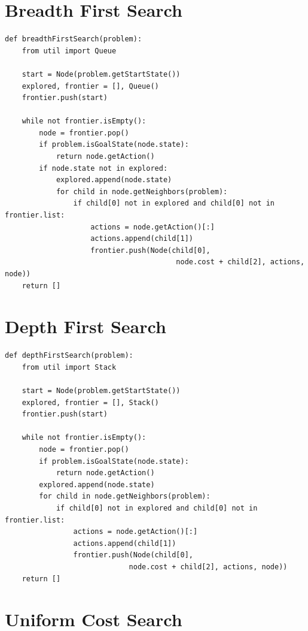 \documentclass[a4paper,12pt]{report}
\begin{document}
\section{Breadth First Search}
\begin{Verbatim}[frame=single]
def breadthFirstSearch(problem):
    from util import Queue

    start = Node(problem.getStartState())
    explored, frontier = [], Queue()
    frontier.push(start)

    while not frontier.isEmpty():
        node = frontier.pop()
        if problem.isGoalState(node.state):
            return node.getAction()
        if node.state not in explored:
            explored.append(node.state)
            for child in node.getNeighbors(problem):
                if child[0] not in explored and child[0] not in frontier.list:
                    actions = node.getAction()[:]
                    actions.append(child[1])
                    frontier.push(Node(child[0],
                                        node.cost + child[2], actions, node))
    return []
\end{Verbatim}

\section{Depth First Search}

\begin{Verbatim}[frame=single]
def depthFirstSearch(problem):
    from util import Stack

    start = Node(problem.getStartState())
    explored, frontier = [], Stack()
    frontier.push(start)

    while not frontier.isEmpty():
        node = frontier.pop()
        if problem.isGoalState(node.state):
            return node.getAction()
        explored.append(node.state)
        for child in node.getNeighbors(problem):
            if child[0] not in explored and child[0] not in frontier.list:
                actions = node.getAction()[:]
                actions.append(child[1])
                frontier.push(Node(child[0],
                             node.cost + child[2], actions, node))
    return []
\end{Verbatim}

\section{Uniform Cost Search}
\end{document}
